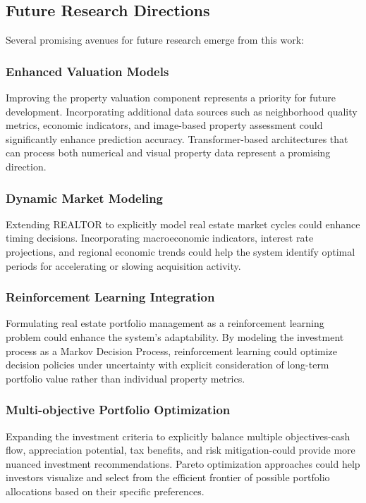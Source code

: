 \documentclass[conference]{IEEEtran}
\begin{document}
\subsection{Future Research Directions}
Several promising avenues for future research emerge from this work:

\subsubsection{Enhanced Valuation Models}
Improving the property valuation component represents a priority for future development. Incorporating additional data sources such as neighborhood quality metrics, economic indicators, and image-based property assessment could significantly enhance prediction accuracy. Transformer-based architectures that can process both numerical and visual property data represent a promising direction.

\subsubsection{Dynamic Market Modeling}
Extending REALTOR to explicitly model real estate market cycles could enhance timing decisions. Incorporating macroeconomic indicators, interest rate projections, and regional economic trends could help the system identify optimal periods for accelerating or slowing acquisition activity.

\subsubsection{Reinforcement Learning Integration}
Formulating real estate portfolio management as a reinforcement learning problem could enhance the system's adaptability. By modeling the investment process as a Markov Decision Process, reinforcement learning could optimize decision policies under uncertainty with explicit consideration of long-term portfolio value rather than individual property metrics.

\subsubsection{Multi-objective Portfolio Optimization}
Expanding the investment criteria to explicitly balance multiple objectives-cash flow, appreciation potential, tax benefits, and risk mitigation-could provide more nuanced investment recommendations. Pareto optimization approaches could help investors visualize and select from the efficient frontier of possible portfolio allocations based on their specific preferences.
\end{document}
